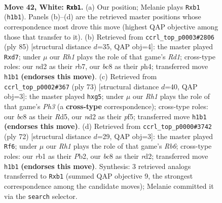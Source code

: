 \documentclass[11pt]{article}
\begin{document}
\clearpage

\begin{figure}[p]\centering
\begin{subfigure}{0.46\textwidth}\centering
\resizebox{\linewidth}{!}{%
\newchessgame
\chessboard[
  setfen={r1b3k1/8/8/8/7p/7P/p2n2P1/Kr5R w - - 2 42},
  showmover=false,
  pgfstyle=straightmove, color=movearrow, markmove={h1-b1}
]}
\caption{}
\end{subfigure}\hfill
\begin{subfigure}{0.46\textwidth}\centering
\resizebox{\linewidth}{!}{%
\newchessgame
\chessboard[
  setfen={3r4/1R1R3p/4k1p1/1p6/4K1PP/8/8/8 b - - 0 43},
  showmover=false,
  pgfstyle=straightmove, color=movearrow, markmove={d8-d7}
]}
\caption{}
\end{subfigure}
\\[4pt]
\begin{subfigure}{0.46\textwidth}\centering
\resizebox{\linewidth}{!}{%
\newchessgame
\chessboard[
  setfen={8/6k1/5R1p/1p1rPPB1/1P1p4/7P/8/6K1 b - - 0 37},
  showmover=false,
  pgfstyle=straightmove, color=movearrow, markmove={h6-g5}
]}
\caption{}
\end{subfigure}\hfill
\begin{subfigure}{0.46\textwidth}\centering
\resizebox{\linewidth}{!}{%
\newchessgame
\chessboard[
  setfen={5k2/2R2p2/1R5p/6p1/6P1/7P/1P1r2r1/7K w - - 0 37},
  showmover=false,
  pgfstyle=straightmove, color=movearrow, markmove={b6-f6}
]}
\caption{}
\end{subfigure}
\caption{\textbf{Move 42, White: \texttt{Rxb1}.} (a) Our position; Melanie plays \texttt{Rxb1} (\texttt{h1b1}). Panels (b)--(d) are the retrieved master positions whose correspondence most drove this move (highest QAP objective among those that transfer to it). (b) Retrieved from \texttt{ccrl\_top\_p0003\#2806} (ply 85) [structural distance $d$=35, QAP obj=4]: the master played \texttt{Rxd7}; under $\mu$ our \emph{Rh1} plays the role of that game's \emph{Rd1}; cross-type roles: our \emph{n}d2 as their \emph{r}b7, our \emph{b}c8 as their \emph{p}h4; transferred move \texttt{h1b1} \textbf{(endorses this move)}. (c) Retrieved from \texttt{ccrl\_top\_p0002\#367} (ply 73) [structural distance $d$=40, QAP obj=3]: the master played \texttt{hxg5}; under $\mu$ our \emph{Rh1} plays the role of that game's \emph{Ph3} (a \textbf{cross-type} correspondence); cross-type roles: our \emph{b}c8 as their \emph{R}d5, our \emph{n}d2 as their \emph{p}f5; transferred move \texttt{h1b1} \textbf{(endorses this move)}. (d) Retrieved from \texttt{ccrl\_top\_p0000\#3742} (ply 72) [structural distance $d$=29, QAP obj=3]: the master played \texttt{Rf6}; under $\mu$ our \emph{Rh1} plays the role of that game's \emph{Rb6}; cross-type roles: our \emph{r}b1 as their \emph{P}b2, our \emph{b}c8 as their \emph{r}d2; transferred move \texttt{h1b1} \textbf{(endorses this move)}. Synthesis: 3 retrieved analogs transferred to \texttt{Rxb1} (summed QAP objective 9, the strongest correspondence among the candidate moves); Melanie committed it via the \texttt{search} selector.}
\label{fig:thought-m82}
\end{figure}
\end{document}
